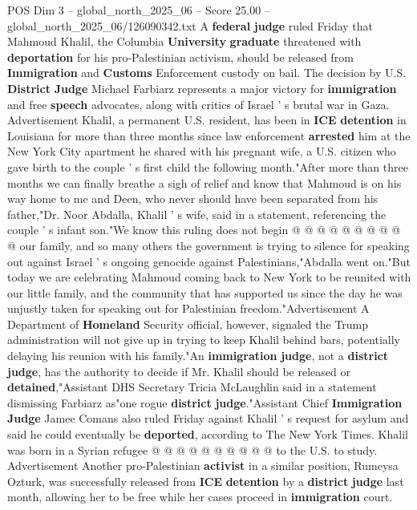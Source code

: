 \begin{textsample}{POS Dim 3 – global\_north\_2025\_06 – Score 25.00 – global\_north\_2025\_06/126090342.txt}  \label{ex:f3_pos_095}
A \textbf{federal} \textbf{judge} ruled Friday that Mahmoud Khalil, the Columbia \textbf{University} \textbf{graduate} threatened with \textbf{deportation} for his pro-Palestinian activism, should be released from \textbf{Immigration} and \textbf{Customs} Enforcement custody on bail.
The decision by U.S. \textbf{District} \textbf{Judge} Michael Farbiarz represents a major victory for \textbf{immigration} and free \textbf{speech} advocates, along with critics of Israel ' s brutal war in Gaza.
Advertisement Khalil, a permanent U.S. resident, has been in \textbf{ICE} \textbf{detention} in Louisiana for more than three months since law enforcement \textbf{arrested} him at the New York City apartment he shared with his pregnant wife, a U.S. citizen who gave birth to the couple ' s first child the following month."After more than three months we can finally breathe a sigh of relief and know that Mahmoud is on his way home to me and Deen, who never should have been separated from his father,"Dr.
Noor Abdalla, Khalil ' s wife, said in a statement, referencing the couple ' s infant son."We know this ruling does not begin @ @ @ @ @ @ @ @ @ @ our family, and so many others the government is trying to silence for speaking out against Israel ' s ongoing genocide against Palestinians,"Abdalla went on."But today we are celebrating Mahmoud coming back to New York to be reunited with our little family, and the community that has supported us since the day he was unjustly taken for speaking out for Palestinian freedom."Advertisement A Department of \textbf{Homeland} Security official, however, signaled the Trump administration will not give up in trying to keep Khalil behind bars, potentially delaying his reunion with his family."An \textbf{immigration} \textbf{judge}, not a \textbf{district} \textbf{judge}, has the authority to decide if Mr.
Khalil should be released or \textbf{detained},"Assistant DHS Secretary Tricia McLaughlin said in a statement dismissing Farbiarz as"one rogue \textbf{district} \textbf{judge}."Assistant Chief \textbf{Immigration} \textbf{Judge} Jamee Comans also ruled Friday against Khalil ' s request for asylum and said he could eventually be \textbf{deported}, according to The New York Times.
Khalil was born in a Syrian refugee @ @ @ @ @ @ @ @ @ @ to the U.S. to study.
Advertisement Another pro-Palestinian \textbf{activist} in a similar position, Rumeysa Ozturk, was successfully released from \textbf{ICE} \textbf{detention} by a \textbf{district} \textbf{judge} last month, allowing her to be free while her cases proceed in \textbf{immigration} court.

\end{textsample}
